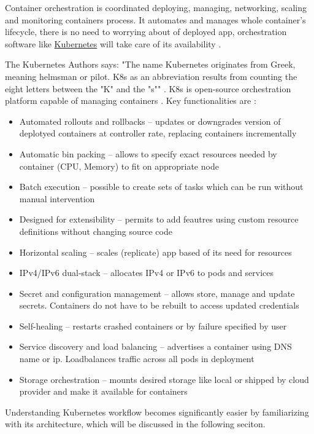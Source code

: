 Container orchestration is coordinated deploying, managing, networking, scaling and monitoring containers process. It automates and manages whole container's lifecycle, there is no need to worrying about of deployed app, orchestration software like \href{https://kubernetes.io/}{Kubernetes} will take care of its availability \cite{RedhatContainerization}.

The Kubernetes Authors says: "The name Kubernetes originates from Greek, meaning helmsman or pilot. K8s as an abbreviation results from counting the eight letters between the "K" and the "s"" \cite{KubernetesDocs}. K8s is open-source orchestration platform capable of managing containers \cite{KubernetesDocs}. Key functionalities are \cite{KubernetesDocs}:

\begin{itemize}
    \item Automated rollouts and rollbacks -- updates or downgrades version of deplotyed containers at controller rate, replacing containers incrementally
    \item Automatic bin packing --  allows to specify exact resources needed by container (CPU, Memory) to fit on appropriate node
    \item Batch execution -- possible to create sets of tasks which can be run without manual intervention
    \item Designed for extensibility -- permits to add feautres using custom resource definitions without changing source code
    \item Horizontal scaling -- scales (replicate) app based of its need for resources
    \item IPv4/IPv6 dual-stack -- allocates IPv4 or IPv6 to pods and services
    \item Secret and configuration management -- allows store, manage and update secrets. Containers do not have to be rebuilt to access updated  credentials
    \item Self-healing -- restarts crashed containers or by failure specified by user
    \item Service discovery and load balancing -- advertises a container using DNS name or ip. Loadbalances traffic across all pods in deployment
    \item Storage orchestration -- mounts desired storage like local or shipped by cloud provider and make it available for containers
\end{itemize}
Understanding Kubernetes workflow becomes significantly easier by familiarizing with its architecture, which will be discussed in the following seciton.


